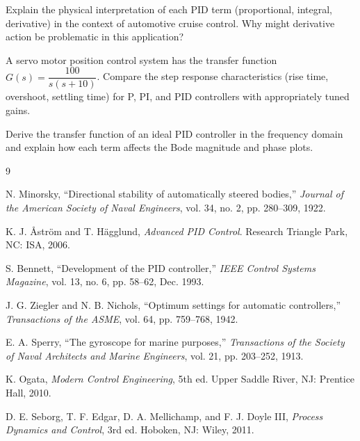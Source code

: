 \begin{exercise}
Explain the physical interpretation of each PID term (proportional, integral, derivative) in the context of automotive cruise control. Why might derivative action be problematic in this application?
\end{exercise}

\begin{exercise}
A servo motor position control system has the transfer function $G(s) = \dfrac{100}{s(s+10)}$. Compare the step response characteristics (rise time, overshoot, settling time) for P, PI, and PID controllers with appropriately tuned gains.
\end{exercise}

\begin{exercise}
Derive the transfer function of an ideal PID controller in the frequency domain and explain how each term affects the Bode magnitude and phase plots.
\end{exercise}



\begin{thebibliography}{9}

N. Minorsky, ``Directional stability of automatically steered bodies,''
\textit{Journal of the American Society of Naval Engineers}, vol. 34, no. 2, pp. 280--309, 1922.

K. J. \r{A}str\"om and T. H\"agglund, \textit{Advanced PID Control}.
Research Triangle Park, NC: ISA, 2006.

S. Bennett, ``Development of the PID controller,''
\textit{IEEE Control Systems Magazine}, vol. 13, no. 6, pp. 58--62, Dec. 1993.

J. G. Ziegler and N. B. Nichols, ``Optimum settings for automatic controllers,''
\textit{Transactions of the ASME}, vol. 64, pp. 759--768, 1942.

E. A. Sperry, ``The gyroscope for marine purposes,''
\textit{Transactions of the Society of Naval Architects and Marine Engineers}, vol. 21, pp. 203--252, 1913.

K. Ogata, \textit{Modern Control Engineering}, 5th ed.
Upper Saddle River, NJ: Prentice Hall, 2010.

D. E. Seborg, T. F. Edgar, D. A. Mellichamp, and F. J. Doyle III,
\textit{Process Dynamics and Control}, 3rd ed.
Hoboken, NJ: Wiley, 2011.

\end{thebibliography}


